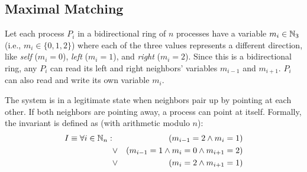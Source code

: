 \subsection{Maximal Matching}


Let each process $P_i$ in a bidirectional ring of $n$ processes have a variable $m_i\in \mathbb{N}_3$ (i.e., $m_i\in \{0,1,2\}$) where each of the three values represents a different direction, like {\it self} ($m_i=0$), {\it left} ($m_i=1$), and {\it right} ($m_i=2$).
Since this is a bidirectional ring, any $P_i$ can read its left and right neighbors' variables $m_{i-1}$ and $m_{i+1}$.
$P_i$ can also read and write its own variable $m_i$.

The system is in a legitimate state when neighbors pair up by pointing at each other.
If both neighbors are pointing away, a process can point at itself.
Formally, the invariant is defined as (with arithmetic modulo $n$):
\begin{eqnarray*}
 I \equiv \forall i\in\mathbb{N}_n: & & (m_{i-1} = 2 \wedge m_i = 1)
                    \\ & \vee  & (m_{i-1} = 1 \wedge m_i = 0 \wedge m_{i+1} = 2)
                    \\ & \vee  & (m_i = 2 \wedge m_{i+1} = 1)
\end{eqnarray*}


